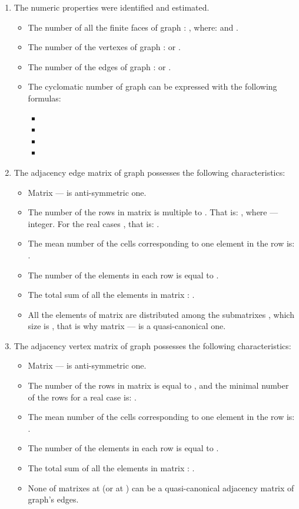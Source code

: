 \documentclass{amsart}
\theoremstyle{plain}
\numberwithin{equation}{section}
\begin{document}
\begin{enumerate}
\item 
The numeric properties were identified and estimated.

\begin {itemize}
\item	
The number of all the finite faces of graph : , where:  and .
\item	
The number of the vertexes of graph :  or .
\item	
The number of the edges of graph :  or .
\item	
The cyclomatic number of graph  can be expressed with the following formulas:

\begin {itemize}
\item 

\item 

\item 

\item 

\end {itemize}
\end {itemize}

\item 
The adjacency edge matrix  of graph  possesses the following characteristics:

\begin {itemize} 
\item 
Matrix  --- is anti-symmetric one.
\item
The number of the rows in matrix  is multiple to . That is: , where  --- integer. For the real cases , that is: .
\item 
The mean number of the cells corresponding to one element in the row is: .
\item 
The number of the elements in each row is equal to .
\item 
The total sum of all the elements in matrix : .
\item 
All the elements  of matrix  are distributed among the submatrixes , which size is , that is why matrix  --- is a quasi-canonical one.
\end {itemize}

\item 
The adjacency vertex matrix  of graph  possesses the following characteristics:

\begin {itemize}
\item 
Matrix  --- is anti-symmetric one.
\item 
The number of the rows  in matrix  is equal to , and the minimal number of the rows for a real case is: .
\item 
The mean number of the cells corresponding to one element in the row is: .
\item 
The number of the elements in each row is equal to . 
\item 
The total sum of all the elements in matrix : .
\item
None of matrixes  at  (or at ) can be a quasi-canonical adjacency matrix of graph's  edges.
\end {itemize}


\end{enumerate}
\end{document}

